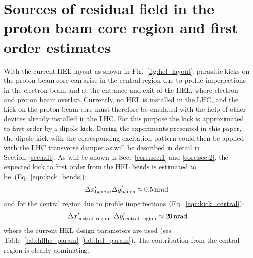 \documentclass[%
 reprint,
 amsmath,amssymb,
 aps,
prstab,
]{revtex4-1}
\begin{document}
\section{Sources of residual field in the proton beam core region and first order estimates\label{sec:core}}
With the current HEL layout as shown in Fig.~\ref{fig:hel_layout}, parasitic kicks on the proton beam core can arise in the central region due to profile imperfections in the electron beam and at the entrance and exit of the HEL, where electron and proton beam overlap. Currently, no HEL is installed in the LHC, and the kick on the proton beam core must therefore be emulated with the help of other devices already installed in the LHC. For this purpose the kick is approximated to first order by a dipole kick. During the experiments presented in this paper, the dipole kick with the corresponding excitation pattern could then be applied with the LHC transverse damper as will be described in detail in Section~\ref{sec:adt}. As will be shown in Sec.~\ref{core:sec:1} and \ref{core:sec:2}, the expected kick to first order from the HEL bends is estimated to be~(Eq.~\ref{eqn:kick_bends}):
\begin{equation}
	\Delta x'_{\rm{bends}},\Delta y'_{\rm{bends}}\approx \SI{0.5}{nrad},
\end{equation}
and for the central region due to profile imperfections~(Eq.~\ref{eqn:kick_central}):
\begin{equation}
	\Delta x'_{\rm{central \ region}}, \Delta y'_{\rm{central \ region}} \approx \SI{20}{nrad} %
\end{equation}
where the current HEL design parameters are used (see Table~\ref{tab:hllhc_param}--\ref{tab:hel_param}). The contribution from the central region is clearly dominating.
\end{document}
